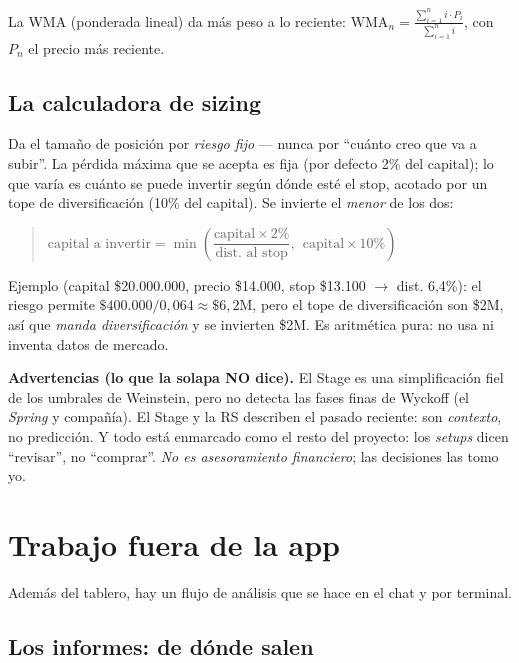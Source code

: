 \documentclass[11pt,a4paper]{article}
\begin{document}
\noindent La WMA (ponderada lineal) da m\'as peso a lo reciente:
$\text{WMA}_n = \frac{\sum_{i=1}^{n} i\cdot P_i}{\sum_{i=1}^{n} i}$, con $P_n$ el
precio m\'as reciente.

\subsection{La calculadora de sizing}

Da el tama\~no de posici\'on por \emph{riesgo fijo} --- nunca por ``cu\'anto creo que
va a subir''. La p\'erdida m\'axima que se acepta es fija (por defecto 2\% del
capital); lo que var\'ia es cu\'anto se puede invertir seg\'un d\'onde est\'e el stop,
acotado por un tope de diversificaci\'on (10\% del capital). Se invierte el
\emph{menor} de los dos:

\begin{quote}
$\text{capital a invertir} = \min\!\left(\dfrac{\text{capital}\times 2\%}{\text{dist.
al stop}},\ \ \text{capital}\times 10\%\right)$
\end{quote}

\noindent Ejemplo (capital \$20.000.000, precio \$14.000, stop \$13.100 $\to$ dist.
6,4\%): el riesgo permite $\$400.000 / 0{,}064 \approx \$6{,}2$M, pero el tope de
diversificaci\'on son \$2M, as\'i que \emph{manda diversificaci\'on} y se invierten
\$2M. Es aritm\'etica pura: no usa ni inventa datos de mercado.

\begin{nota}
\textbf{Advertencias (lo que la solapa NO dice).} El Stage es una simplificaci\'on
fiel de los umbrales de Weinstein, pero no detecta las fases finas de Wyckoff (el
\emph{Spring} y compa\~n\'ia). El Stage y la RS describen el pasado reciente: son
\emph{contexto}, no predicci\'on. Y todo est\'a enmarcado como el resto del proyecto:
los \emph{setups} dicen ``revisar'', no ``comprar''. \emph{No es asesoramiento
financiero}; las decisiones las tomo yo.
\end{nota}

\section{Trabajo fuera de la app}

Adem\'as del tablero, hay un flujo de an\'alisis que se hace en el chat y por terminal.

\subsection{Los informes: de d\'onde salen}
\end{document}
